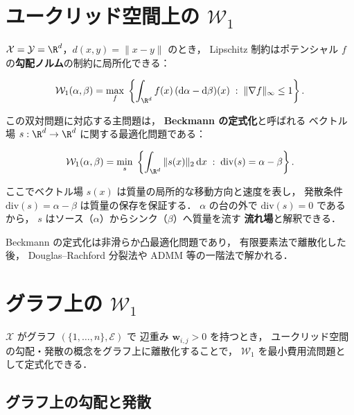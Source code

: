\section{ユークリッド空間上の $\mathcal{W}_1$}\label{sec:w1-euclidean}

$\mathcal{X} = \mathcal{Y} = \R^d$，$d(x,y) = \|x - y\|$ のとき，
Lipschitz 制約はポテンシャル $f$ の\textbf{勾配ノルム}の制約に局所化できる：

\begin{equation}\label{eq:w1-gradient}
  \mathcal{W}_1(\alpha, \beta)
  = \max_f\; \left\{
    \int_{\R^d} f(x)\, (\mathrm{d}\alpha - \mathrm{d}\beta)(x)
    \;:\; \|\nabla f\|_\infty \leq 1
  \right\}.
\end{equation}

この双対問題に対応する主問題は，
\textbf{Beckmann の定式化}と呼ばれる
ベクトル場 $s : \R^d \to \R^d$ に関する最適化問題である：

\begin{equation}\label{eq:beckmann}
  \mathcal{W}_1(\alpha, \beta)
  = \min_s\; \left\{
    \int_{\R^d} \|s(x)\|_2\, \mathrm{d}x
    \;:\; \mathrm{div}(s) = \alpha - \beta
  \right\}.
\end{equation}

ここでベクトル場 $s(x)$ は質量の局所的な移動方向と速度を表し，
発散条件 $\mathrm{div}(s) = \alpha - \beta$ は質量の保存を保証する．
$\alpha$ の台の外で $\mathrm{div}(s) = 0$ であるから，
$s$ はソース（$\alpha$）からシンク（$\beta$）へ質量を流す
\textbf{流れ場}と解釈できる．

Beckmann の定式化は非滑らか凸最適化問題であり，
有限要素法で離散化した後，
Douglas--Rachford 分裂法や ADMM 等の一階法で解かれる．


\section{グラフ上の $\mathcal{W}_1$}\label{sec:w1-graph}

$\mathcal{X}$ がグラフ $(\{1, \ldots, n\}, \mathcal{E})$ で
辺重み $\mathbf{w}_{i,j} > 0$ を持つとき，
ユークリッド空間の勾配・発散の概念をグラフ上に離散化することで，
$\mathcal{W}_1$ を最小費用流問題として定式化できる．

\subsection{グラフ上の勾配と発散}\label{subsec:graph-operators}

